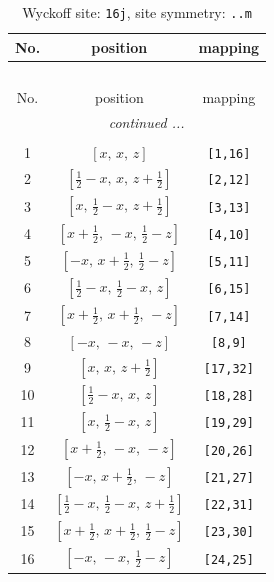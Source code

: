 \documentclass[fleqn,8pt]{jsarticle}
\begin{document}
\renewcommand{\arraystretch}{1.2}
\begin{longtable}{ccc}
\caption{Wyckoff site: {\tt 16j}, site symmetry: {\tt ..m}}
 \\
 \hline \hline
No. & position & mapping \\ \hline \endfirsthead

\multicolumn{2}{l}{\tablename\ \thetable{}} \\
 \hline \hline
No. & position & mapping \\ \hline \endhead

 \hline \hline
\multicolumn{2}{r}{\footnotesize\it continued ...} \\ \endfoot

 \hline \hline
\multicolumn{2}{r}{} \\ \endlastfoot

1 & $\left[ x,\, x,\, z \right]$ & {\tt [1,16]} \\ \hline
2 & $\left[ \frac{1}{2} - x,\, x,\, z + \frac{1}{2} \right]$ & {\tt [2,12]} \\ \hline
3 & $\left[ x,\, \frac{1}{2} - x,\, z + \frac{1}{2} \right]$ & {\tt [3,13]} \\ \hline
4 & $\left[ x + \frac{1}{2},\, - x,\, \frac{1}{2} - z \right]$ & {\tt [4,10]} \\ \hline
5 & $\left[ - x,\, x + \frac{1}{2},\, \frac{1}{2} - z \right]$ & {\tt [5,11]} \\ \hline
6 & $\left[ \frac{1}{2} - x,\, \frac{1}{2} - x,\, z \right]$ & {\tt [6,15]} \\ \hline
7 & $\left[ x + \frac{1}{2},\, x + \frac{1}{2},\, - z \right]$ & {\tt [7,14]} \\ \hline
8 & $\left[ - x,\, - x,\, - z \right]$ & {\tt [8,9]} \\ \hline
9 & $\left[ x,\, x,\, z + \frac{1}{2} \right]$ & {\tt [17,32]} \\ \hline
10 & $\left[ \frac{1}{2} - x,\, x,\, z \right]$ & {\tt [18,28]} \\ \hline
11 & $\left[ x,\, \frac{1}{2} - x,\, z \right]$ & {\tt [19,29]} \\ \hline
12 & $\left[ x + \frac{1}{2},\, - x,\, - z \right]$ & {\tt [20,26]} \\ \hline
13 & $\left[ - x,\, x + \frac{1}{2},\, - z \right]$ & {\tt [21,27]} \\ \hline
14 & $\left[ \frac{1}{2} - x,\, \frac{1}{2} - x,\, z + \frac{1}{2} \right]$ & {\tt [22,31]} \\ \hline
15 & $\left[ x + \frac{1}{2},\, x + \frac{1}{2},\, \frac{1}{2} - z \right]$ & {\tt [23,30]} \\ \hline
16 & $\left[ - x,\, - x,\, \frac{1}{2} - z \right]$ & {\tt [24,25]} \\
\end{longtable}
\end{document}

